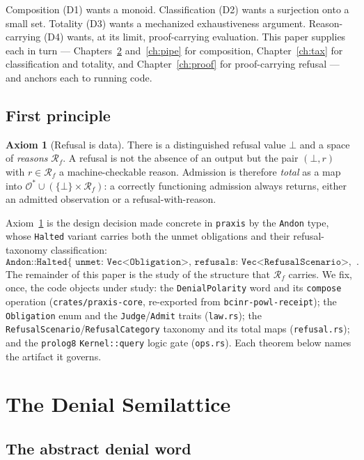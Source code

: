 \documentclass[11pt,oneside]{book}
\theoremstyle{definition}
\newtheorem{axiom}{Axiom}[chapter]
\theoremstyle{plain}
\theoremstyle{remark}
\newcommand{\Adm}{\mathcal{O}^{*}}             %
\newcommand{\Rfsl}{\bot}                        %
\newcommand{\code}[1]{\texttt{#1}}
\begin{document}
Composition (D1) wants a monoid. Classification (D2) wants a surjection onto a small set.
Totality (D3) wants a mechanized exhaustiveness argument. Reason-carrying (D4) wants, at its
limit, proof-carrying evaluation. This paper supplies each in turn --- Chapters~\ref{ch:sl}
and~\ref{ch:pipe} for composition, Chapter~\ref{ch:tax} for classification and totality, and
Chapter~\ref{ch:proof} for proof-carrying refusal --- and anchors each to running code.

\section{First principle}

\begin{axiom}[Refusal is data]\label{ax:refusal}
There is a distinguished refusal value $\Rfsl$ and a space of \emph{reasons} $\mathcal{R}_{\!f}$.
A refusal is not the absence of an output but the pair $(\Rfsl,r)$ with $r\in\mathcal{R}_{\!f}$
a machine-checkable reason. Admission is therefore \emph{total} as a map into
$\Adm\cup(\{\Rfsl\}\times\mathcal{R}_{\!f})$: a correctly functioning admission always
returns, either an admitted observation or a refusal-with-reason.
\end{axiom}

Axiom~\ref{ax:refusal} is the design decision made concrete in \code{praxis} by the
\code{Andon} type, whose \code{Halted} variant carries both the unmet obligations and their
refusal-taxonomy classification:
\[
\code{Andon::Halted\{\ unmet:\ Vec<Obligation>,\ refusals:\ Vec<RefusalScenario>,\ at:\ u64\ \}}.
\]
The remainder of this paper is the study of the structure that $\mathcal{R}_{\!f}$ carries.
We fix, once, the code objects under study: the \code{DenialPolarity} word and its
\code{compose} operation (\code{crates/praxis-core}, re-exported from \code{bcinr-powl-receipt});
the \code{Obligation} enum and the \code{Judge}/\code{Admit} traits (\code{law.rs}); the
\code{RefusalScenario}/\code{RefusalCategory} taxonomy and its total maps (\code{refusal.rs});
and the \code{prolog8} \code{Kernel::query} logic gate (\code{ops.rs}). Each theorem below names
the artifact it governs.

\chapter{The Denial Semilattice}
\label{ch:sl}

\section{The abstract denial word}
\end{document}
